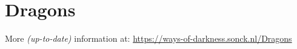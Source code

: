 \section{Dragons}
More \textit{(up-to-date)} information at: \url{https://ways-of-darkness.sonck.nl/Dragons}


